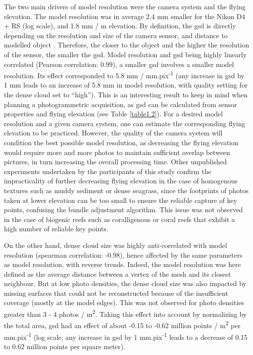 The two main drivers of model resolution were the camera system and the flying elevation. The model resolution was in average 2.4 mm smaller for the Nikon D4 + RS (log scale), and 1.8 mm / m elevation. By definition, the \acrshort{gsd} is directly depending on the resolution and size of the camera sensor, and distance to modelled object \citep{forstner_photogrammetric_2016}. Therefore, the closer to the object and the higher the resolution of the sensor, the smaller the \acrshort{gsd}. Model resolution and \acrshort{gsd} being highly linearly correlated (Pearson correlation: 0.99), a smaller \acrshort{gsd} involves a smaller model resolution. Its effect corresponded to 5.8 mm / mm.pix\textsuperscript{-1} (any increase in \acrshort{gsd} by 1 mm leads to an increase of 5.8 mm in model resolution, with quality setting for the dense cloud set to “high”). This is an interesting result to keep in mind when planning a photogrammetric acquisition, as \acrshort{gsd} can be calculated from sensor properties and flying elevation (see Table \ref{table1.2}). For a desired model resolution and a given camera system, one can estimate the corresponding flying elevation to be practiced. However, the quality of the camera system will condition the best possible model resolution, as decreasing the flying elevation would require more and more photos to maintain sufficient overlap between pictures, in turn increasing the overall processing time. Other unpublished experiments undertaken by the participants of this study confirm the impracticality of further decreasing flying elevation in the case of homogenous textures such as muddy sediment or dense seagrass, since the footprints of photos taken at lower elevation can be too small to ensure the reliable capture of key points, confusing the bundle adjustment algorithm. This issue was not observed in the case of biogenic reefs such as coralligenous or coral reefs that exhibit a high number of reliable key points.

On the other hand, dense cloud size was highly anti-correlated with model resolution (spearman correlation: -0.98), hence affected by the same parameters as model resolution, with reverse trends. Indeed, the model resolution was here defined as the average distance between a vertex of the mesh and its closest neighbour. But at low photo densities, the dense cloud size was also impacted by missing surfaces that could not be reconstructed because of the insufficient coverage (mostly at the model edges). This was not observed for photo densities greater than 3 - 4 photos / m\textsuperscript{2}. Taking this effect into account by normalizing by the total area, \acrshort{gsd} had an effect of about -0.15 to -0.62 million points / m\textsuperscript{2} per mm.pix\textsuperscript{-1} (log scale; any increase in \acrshort{gsd} by 1 mm.pix\textsuperscript{-1} leads to a decrease of 0.15 to 0.62 million points per square meter).

